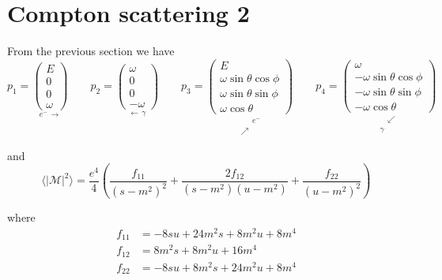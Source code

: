 

\section*{Compton scattering 2}

From the previous section we have
\begin{equation*}
p_1=\underset{e^- \, \longrightarrow}
{\begin{pmatrix}E\\0\\0\\ \omega\end{pmatrix}}
\qquad
p_2=\underset{\longleftarrow \, \gamma}
{\begin{pmatrix}\omega\\0\\0\\-\omega\end{pmatrix}}
\qquad
p_3=\underset{\substack{\phantom{\nearrow} \, e^-\\\nearrow \, \phantom{e^-}}}
{\begin{pmatrix}
E\\
\omega\sin\theta\cos\phi\\
\omega\sin\theta\sin\phi\\
\omega\cos\theta
\end{pmatrix}}
\qquad
p_4=\underset{\substack{\phantom{\gamma} \, \swarrow\\\gamma \, \phantom{\swarrow}}}
{\begin{pmatrix}
\omega\\
-\omega\sin\theta\cos\phi\\
-\omega\sin\theta\sin\phi\\
-\omega\cos\theta
\end{pmatrix}}
\end{equation*}

and
\begin{equation*}
\langle|\mathcal{M}|^2\rangle=\frac{e^4}{4}
\left(\frac{f_{11}}{(s-m^2)^2}+\frac{2f_{12}}{(s-m^2)(u-m^2)}+\frac{f_{22}}{(u-m^2)^2}\right)
\end{equation*}

where
\begin{align*}
f_{11}&=-8 s u + 24 m^2 s + 8 m^2 u + 8 m^4
\\
f_{12}&=8 m^2 s + 8 m^2 u + 16 m^4
\\
f_{22}&=-8 s u + 8 m^2 s + 24 m^2 u + 8 m^4
\end{align*}

